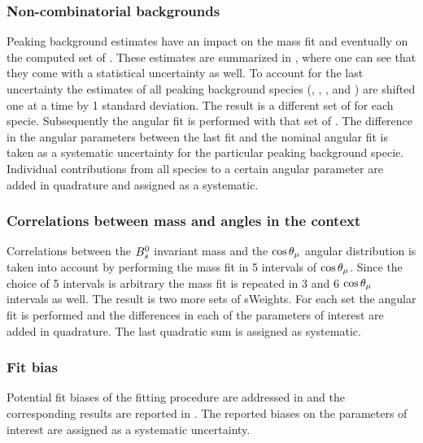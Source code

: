 \subsubsection{Non-combinatorial backgrounds}
\label{systPeakBkg}
Peaking background estimates have an impact on the mass fit and eventually on the computed set of \sWeights.
These estimates are summarized in , where one can see that they come with a statistical uncertainty as well.
To account for the last uncertainty  the estimates of all peaking background species (\BsJpsiKK, \BsJpsipipi, \BdJpsipipi, and \LbJpsipK)
are shifted one at a time by 1 standard deviation. The result is a different set of \sWeights for each specie.
Subsequently the angular fit is performed with that set of \sWeights. The difference in the angular parameters
between the last fit and the nominal angular fit is taken as a systematic uncertainty for the particular peaking background specie.
Individual contributions from all species to a certain angular parameter are added in quadrature and assigned as a systematic.

\subsubsection{Correlations between mass and angles in the \sPlot context}
\label{systCorrs}
Correlations between the $B^0_s$ invariant mass and the $\cos\theta_{\mu}$ angular distribution is taken into account
by performing the mass fit in 5 intervals of $\cos\theta_{\mu}$. Since the choice of 5 intervals is arbitrary the mass fit is
repeated in 3 and 6 $\cos\theta_{\mu}$ intervals as well. The result is two more sets of sWeights. For each set the angular
fit is performed and the differences in each of the parameters of interest are added in quadrature. The last quadratic
sum is assigned as systematic.

\subsubsection{Fit bias}
\label{systFitBias}
Potential fit biases of the fitting procedure are addressed in  and the corresponding
results are reported in . The reported biases on the parameters of interest are assigned as a systematic uncertainty.


